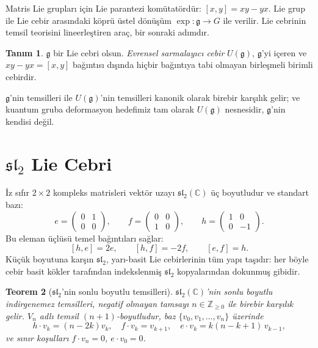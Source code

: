 \documentclass[12pt,a4paper,fleqn]{report}
\newcommand{\normalsemi}{;}
\newcommand{\normalsemi}{\begingroup\semicolonfont;\endgroup}
\numberwithin{equation}{chapter}
\theoremstyle{plain}
\newtheorem{theorem}{Teorem}[chapter]
\theoremstyle{definition}
\newtheorem{definition}[theorem]{Tanım}
\renewcommand{\sl}{\mathfrak{sl}}
\newcommand{\gfrak}{\mathfrak{g}}
\newcommand{\C}{\mathbb{C}}
\newcommand{\Z}{\mathbb{Z}}
\begin{document}
Matris Lie grupları için Lie parantezi komütatördür: $[x,y] = xy - yx$.
Lie grup ile Lie cebir arasındaki köprü üstel dönüşüm $\exp : \gfrak \to G$ ile
verilir. Lie cebrinin temsil teorisini lineerleştiren araç, bir sonraki
adımdır.

\begin{definition}
$\gfrak$ bir Lie cebri olsun. \emph{Evrensel sarmalayıcı cebir} $U(\gfrak)$,
$\gfrak$'yi içeren ve $xy - yx = [x,y]$ bağıntısı dışında hiçbir bağıntıya
tabi olmayan birleşmeli birimli cebirdir.
\end{definition}

$\gfrak$'nin temsilleri ile $U(\gfrak)$'nin temsilleri kanonik olarak birebir
karşılık gelir\normalsemi{} ve kuantum gruba deformasyon hedefimiz tam olarak $U(\gfrak)$
nesnesidir, $\gfrak$'nin kendisi değil.

\section{$\sl_2$ Lie Cebri}

İz sıfır $2 \times 2$ kompleks matrisleri vektör uzayı $\sl_2(\C)$ üç
boyutludur ve standart bazı:
\begin{equation}
  e = \begin{pmatrix} 0 & 1 \\ 0 & 0 \end{pmatrix},\qquad
  f = \begin{pmatrix} 0 & 0 \\ 1 & 0 \end{pmatrix},\qquad
  h = \begin{pmatrix} 1 & 0 \\ 0 & -1 \end{pmatrix}.
\end{equation}
Bu eleman üçlüsü temel bağıntıları sağlar:
\begin{equation}\label{eq:sl2-rels}
  [h,e] = 2e, \qquad [h,f] = -2f, \qquad [e,f] = h.
\end{equation}
Küçük boyutuna karşın $\sl_2$, yarı-basit Lie cebirlerinin tüm yapı
taşıdır: her böyle cebir basit kökler tarafından indekslenmiş $\sl_2$
kopyalarından dokunmuş gibidir.

\begin{theorem}[$\sl_2$'nin sonlu boyutlu temsilleri]
$\sl_2(\C)$'nin sonlu boyutlu indirgenemez temsilleri, negatif olmayan
tamsayı $n \in \Z_{\geq 0}$ ile birebir karşılık gelir. $V_n$ adlı temsil
$(n+1)$-boyutludur, baz $\{v_0, v_1, \dots, v_n\}$ üzerinde
\begin{equation}
  h \cdot v_k = (n - 2k) v_k, \quad
  f \cdot v_k = v_{k+1}, \quad
  e \cdot v_k = k(n-k+1)\, v_{k-1},
\end{equation}
ve sınır koşulları $f \cdot v_n = 0$, $e \cdot v_0 = 0$.
\end{theorem}
\end{document}
